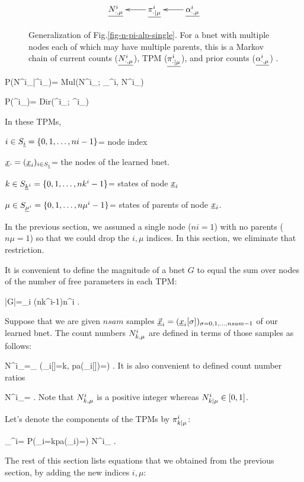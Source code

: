 \begin{figure}[h!]
$$
\xymatrix{
\ul{N^i_\dotmu}
&\ul{\pi^i_\dotbarmu}\ar[l]
&
\ul{\alp^i_\dotmu}\ar[l]
}$$
\caption{
Generalization
of Fig.\ref{fig-n-pi-alp-single}.
For a bnet with multiple nodes
each of which may have multiple parents,
this is  a
Markov chain of
current counts ($\underline{N^i_{\cdot, \mu}}$),
TPM ($\underline{\pi^i_{\cdot|\mu}}$),
and
prior counts ($\underline{\alpha^i_{\cdot, \mu}}$)
.}
\label{fig-n-pi-alp-many}
\end{figure}

\beq\color{blue}
P(N^i_\dotmu|\pi^i_\dotbarmu)=
Mul(N^i_\dotmu;
\pi_\dotbarmu^i, N^i_\plusmu)
\eeq

\beq\color{blue}
P(\pi^i_\dotbarmu)=
Dir(\pi^i_\dotbarmu; \alp^i_\dotmu)
\eeq

In these TPMs,

$i\in
S_{\underline{i}}=\{0, 1, \dots, ni-1\}$= node index

${\underline{x}}.=({\underline{x}}_i)_{i\in S_{\underline{i}}}$= the 
nodes of the learned bnet.

$k\in
S_{{\underline{k}}^i}=\{0, 1, \dots, nk^i-1\}$= states 
of node ${\underline{x}}_i$

$\mu\in
S_{\underline{\mu}^i}=\{0, 1, \dots, n\mu^i-1\}$=
states of parents of node ${\underline{x}}_i$.

In the previous section,
we assumed a single node ($ni=1$)
with no parents ($n\mu=1$)
so that 
we could drop  the $i, \mu$
indices.
In this section, we eliminate
that restriction.


It is 
convenient
to define the magnitude of a  bnet
 $G$
to equal the sum
over nodes of the number 
of free parameters in each TPM:

\beq
|G|=\sum_i
(nk^i-1)n\mu^i
\;.
\eeq

Suppose that 
we are given $nsam$ samples 
$
\vec{{\underline{x}}}_i=
({\underline{x}}_i[\sigma])_
{\sigma=0, 1, \ldots, nsam-1}
$ of 
our learned bnet. The count numbers
$N^i_{k,\mu}$ are defined 
in terms of those samples 
as follows:
 

\beq
N^i_\kmu=\sum_\sigma
\indi(\rvx_i[\sigma]=k, pa(\rvx_i[\sigma])=\mu )
\;.
\eeq
It is also convenient
to
defined
count number ratios

\beq
N^i_\kbarmu=
\;.
\eeq
Note that
$N^i_{k,\mu}$
is a positive integer whereas
$N^i_{k|\mu}\in[0,1]$.

Let's denote
the components of the TPMs by
$\pi^i_{k|\mu}$:


\beq
\pi_\kbarmu^i=
P(\rvx_i=k\cond pa(\rvx_i)=\mu )
\approx
N^i_\kbarmu
\;.
\eeq


The rest
of this section
lists equations that
we obtained 
from the previous
section, by adding the new indices
$i, \mu$:


